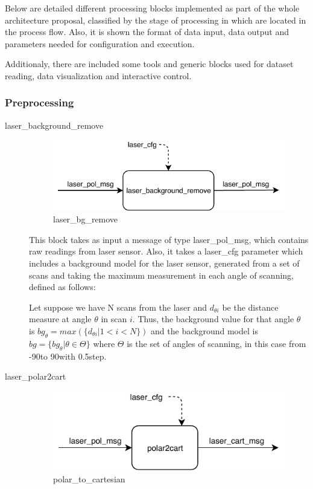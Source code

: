 Below are detailed different processing blocks implemented as part of the whole architecture proposal, classified by the stage of processing in which are located in the process flow. Also, it is shown the format of data input, data output and parameters needed for configuration and execution.

Additionaly, there are included some tools and generic blocks used for dataset reading, data visualization and interactive control.

\subsubsection{Preprocessing}
\begin{description}
\item[laser\_background\_remove] \hfill

\begin{figure}[ht!]
\centering
\includegraphics[scale=1]{fig/3/laser_bg_remove.pdf}
\caption{laser\_bg\_remove}
\label{laser_bg_remove}
\end{figure}

This block takes as input a message of type laser\_pol\_msg, which contains raw readings from laser sensor. Also, it takes a laser\_cfg parameter which includes a background model for the laser sensor, generated from a set of scans and taking the maximum measurement in each angle of scanning, defined as follows:

Let suppose we have N scans from the laser and $d_{\theta i}$ be the distance measure at angle $\theta$ in scan $i$. Thus, the background value for that angle $\theta$ is $bg_\theta = max( \{d_{\theta i} | 1 < i < N\})$ and the background model is $bg = \{bg_\theta | \theta \in \Theta\} $ where $\Theta$ is the set of angles of scanning, in this case from -90\degree to 90\degree with 0.5\degree step.

\item[laser\_polar2cart] \hfill

\begin{figure}[ht!]
\centering
\includegraphics[scale=1]{fig/3/polar2cart.pdf}
\caption{polar\_to\_cartesian}
\label{polar_to_cartesian}
\end{figure}


\end{description}

